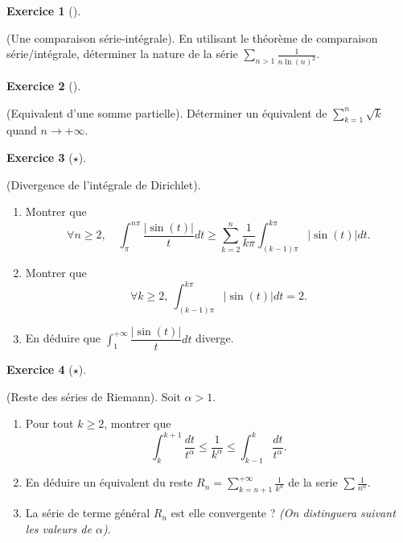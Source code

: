 \documentclass[
  french,
  letterpaper,
  DIV=11,
  numbers=noendperiod]{scrreprt}
\theoremstyle{plain}
\theoremstyle{definition}
\theoremstyle{plain}
\theoremstyle{plain}
\theoremstyle{definition}
\newtheorem{exercise}{Exercice}[chapter]
\theoremstyle{definition}
\theoremstyle{plain}
\theoremstyle{remark}
\begin{document}
\begin{exercise}[]\protect\hypertarget{exr-02-0002}{}\label{exr-02-0002}

(Une comparaison série-intégrale). En utilisant le théorème de
comparaison série/intégrale, déterminer la nature de la série
\(\sum_{n>1}\frac{1}{n\ln(n)^2}\).

\end{exercise}

\begin{exercise}[]\protect\hypertarget{exr-02-0003}{}\label{exr-02-0003}

(Equivalent d'une somme partielle). Déterminer un équivalent de
\(\sum_{k=1}^n\sqrt{k}\) quand \(n\to +\infty\).

\end{exercise}

\begin{exercise}[\(\star\)]\protect\hypertarget{exr-02-0004}{}\label{exr-02-0004}

(Divergence de l'intégrale de Dirichlet).

\begin{enumerate}
\def\labelenumi{\arabic{enumi}.}
\item
  Montrer que
  \[\forall n\geqslant 2,\quad \int_{\pi}^{n\pi}\frac{|\sin(t)|}{t}dt\geqslant \sum_{k=2}^n\frac{1}{k\pi}\int_{(k-1)\pi}^{k\pi}|\sin(t)|dt.\]
\item
  Montrer que
  \[\forall k\geqslant 2,\ \int_{(k-1)\pi}^{k\pi}|\sin(t)|dt = 2.\]
\item
  En déduire que
  \(\displaystyle\int_{1}^{+\infty}\dfrac{|\sin(t)|}{t}dt\) diverge.
\end{enumerate}

\end{exercise}

\begin{exercise}[\(\star\)]\protect\hypertarget{exr-02-reste-riem}{}\label{exr-02-reste-riem}

(Reste des séries de Riemann). Soit \(\alpha >1\).

\begin{enumerate}
\def\labelenumi{\arabic{enumi}.}
\item
  Pour tout \(k\geqslant 2\), montrer que
  \[\int_{k}^{k+1}\frac{dt}{t^\alpha}\leqslant\frac{1}{k^\alpha}\leqslant\int_{k-1}^k\frac{dt}{t^\alpha}.\]
\item
  En déduire un équivalent du reste \(\displaystyle
  R_n=\sum_{k=n+1}^{+\infty}\frac{1}{k^{\alpha}}\) de la serie
  \(\displaystyle\sum \frac{1}{n^\alpha}\).
\item
  La série de terme général \(R_n\) est elle convergente ? \emph{(On
  distinguera suivant les valeurs de \(\alpha\))}.
\end{enumerate}

\end{exercise}
\end{document}
